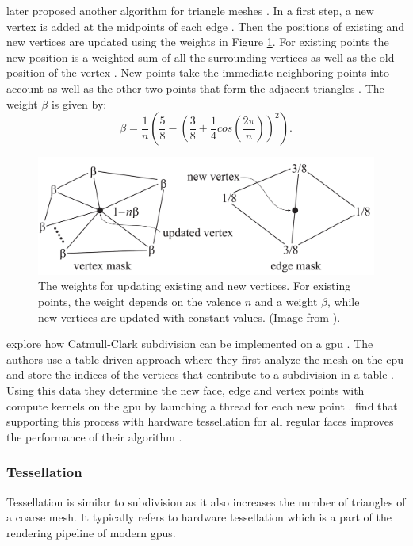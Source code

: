 \citeauthor{loop_subdivision} later proposed another algorithm for triangle meshes \cite{loop_subdivision}.
In a first step, a new vertex is added at the midpoints of each edge \cite{loop_subdivision}.
Then the positions of existing and new vertices are updated using the weights in Figure \ref{fig:loop_subdivision}.
For existing points the new position is a weighted sum of all the surrounding vertices as well as the old position of the vertex \cite{loop_subdivision}.
New points take the immediate neighboring points into account as well as the other two points that form the adjacent triangles \cite{loop_subdivision}.
The weight $\beta$ is given by:
\begin{equation*}
    \beta = \frac{1}{n}(\frac{5}{8} - (\frac{3}{8} + \frac{1}{4}cos(\frac{2\pi}{n}))^2).
\end{equation*}
\begin{figure}[ht]
    \centering
    \includegraphics[width=0.5\linewidth]{img/loop_subdivision.png}
    \caption[Weights in Loop subdivision]{The weights for updating existing and new vertices. For existing points, the weight depends on the valence $n$ and a weight $\beta$, while new vertices are updated with constant values. (Image from \cite{realtime}).}
    \label{fig:loop_subdivision}
\end{figure}

\citeauthor{niessner_subdivision} explore how Catmull-Clark subdivision can be implemented on a \ac{gpu} \cite{niessner_subdivision}.
The authors use a table-driven approach where they first analyze the mesh on the \ac{cpu} and store the indices of the vertices that contribute to a subdivision in a table \cite{niessner_subdivision}.
Using this data they determine the new face, edge and vertex points with compute kernels on the \ac{gpu} by launching a thread for each new point \cite{niessner_subdivision}.
\citeauthor{niessner_subdivision} find that supporting this process with hardware tessellation for all regular faces improves the performance of their algorithm \cite{niessner_subdivision}.


\subsubsection*{Tessellation}
Tessellation is similar to subdivision as it also increases the number of triangles of a coarse mesh.
It typically refers to hardware tessellation which is a part of the rendering pipeline of modern \acp{gpu}.


